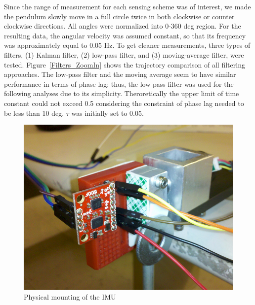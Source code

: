 \documentclass{article}
\theoremstyle{plain}
\theoremstyle{definition}
\theoremstyle{remark}
\begin{document}
Since the range of measurement for each sensing scheme was of interest, we made the pendulum slowly move in a full circle twice in both clockwise or counter clockwise directions. All angles were normalized into 0-360 deg region. For the resulting data, the angular velocity was assumed constant, so that its frequency was approximately equal to 0.05 Hz. To get cleaner measurements, three types of filters, (1) Kalman filter, (2) low-pass filter, and (3) moving-average filter, were tested. Figure~\ref{Filters_ZoomIn} shows the trajectory comparison of all filtering approaches. The low-pass filter and the moving average seem to have similar performance in terms of phase lag; thus, the low-pass filter was used for the following analyses due to its simplicity. Theroretically the upper limit of time constant could not exceed 0.5 considering the constraint of phase lag needed to be less than 10 deg. $\tau$ was initially set to 0.05.\\ 

\begin{figure}[hbt]
\begin{center}
\includegraphics[width = 13cm]{SensorMounting.png}
\caption{Physical mounting of the IMU}
\label{sensorMount}
\end{center}
\end{figure}
\end{document}
